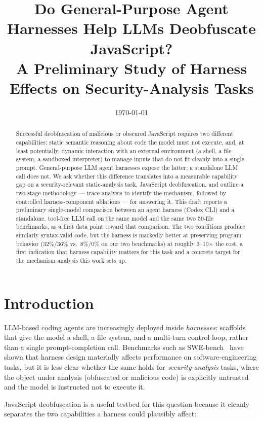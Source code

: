 \documentclass[11pt]{article}
\title{Do General-Purpose Agent Harnesses Help LLMs Deobfuscate JavaScript?\\
\large A Preliminary Study of Harness Effects on Security-Analysis Tasks}
\author{\todo{Author name(s) and affiliation}}
\date{\today}
\begin{document}
\maketitle

\begin{abstract}
Successful deobfuscation of malicious or obscured JavaScript requires two
different capabilities: static semantic reasoning about code the model must
not execute, and, at least potentially, dynamic interaction with an external
environment (a shell, a file system, a sandboxed interpreter) to manage
inputs that do not fit cleanly into a single prompt. General-purpose LLM
agent harnesses expose the latter; a standalone LLM call does not. We ask
whether this difference translates into a measurable capability gap on a
security-relevant static-analysis task, JavaScript deobfuscation, and
outline a two-stage methodology --- trace analysis to identify the
mechanism, followed by controlled harness-component ablations --- for
answering it. This draft reports a preliminary single-model comparison
between an agent harness (Codex CLI) and a standalone, tool-free LLM call
on the same model and the same two 50-file benchmarks, as a first data
point toward that comparison. The two conditions produce similarly
syntax-valid code, but the harness is markedly better at preserving
program behavior (32\%/36\% vs.\ 8\%/0\% on our two benchmarks) at
roughly 3--10$\times$ the cost, a first indication that harness capability
matters for this task and a concrete target for the mechanism analysis
this work sets up.
\end{abstract}

\section{Introduction}
\label{sec:intro}

LLM-based coding agents are increasingly deployed inside \emph{harnesses}:
scaffolds that give the model a shell, a file system, and a multi-turn
control loop, rather than a single prompt-completion call. Benchmarks such
as SWE-bench~\cite{jimenez2024swebench} have shown that harness design
materially affects performance on software-engineering tasks, but it is
less clear whether the same holds for \emph{security-analysis} tasks, where
the object under analysis (obfuscated or malicious code) is explicitly
untrusted and the model is instructed not to execute it.

JavaScript deobfuscation is a useful testbed for this question because it
cleanly separates the two capabilities a harness could plausibly affect:
\end{document}
